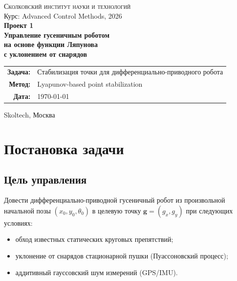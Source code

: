 \documentclass[12pt, a4paper]{article}
\theoremstyle{definition}
\theoremstyle{plain}
\begin{document}
\begin{titlepage}
\centering
\vspace*{2cm}

{\Large\textsc{Сколковский институт науки и технологий}}\\[0.3cm]
{\large Курс: Advanced Control Methods, 2026}\\[2.5cm]

{\LARGE\bfseries Проект 1\\[0.4cm]
Управление гусеничным роботом\\
на основе функции Ляпунова\\[0.2cm]
с уклонением от снарядов}\\[2.5cm]

{\large
\begin{tabular}{rl}
\textbf{Задача:} & Стабилизация точки для дифференциально-приводного робота \\
\textbf{Метод:} & Lyapunov-based point stabilization \\
\textbf{Дата:}  & \today
\end{tabular}
}

\vfill
{\small Skoltech, Москва}
\end{titlepage}

\tableofcontents
\newpage

\section{Постановка задачи}\label{sec:problem}

\subsection{Цель управления}

Довести дифференциально-приводной гусеничный робот из произвольной начальной позы
$(x_0, y_0, \theta_0)$ в целевую точку $\mathbf{g} = (g_x, g_y)$ при следующих условиях:
\begin{itemize}[nosep]
  \item обход известных статических круговых препятствий;
  \item уклонение от снарядов стационарной пушки (Пуассоновский процесс);
  \item аддитивный гауссовский шум измерений (GPS/IMU).
\end{itemize}
\end{document}
